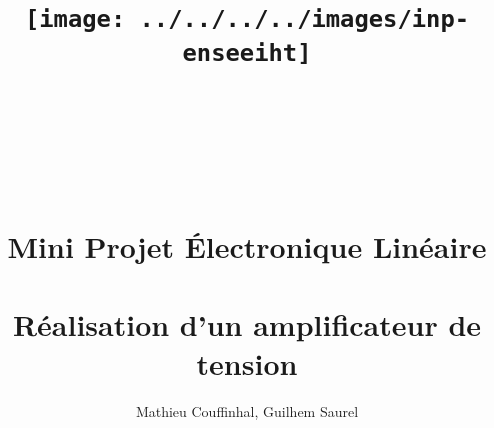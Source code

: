 \documentclass[11pt;a4paper]{report}
\title{\texttt{[image: ../../../../images/inp-enseeiht]} \\ ~ \\ ~ \\ ~ \\ ~ \\ Mini Projet Électronique Linéaire \\ ~ \\ \large{Réalisation d'un amplificateur de tension}}
\author{Mathieu Couffinhal, Guilhem Saurel}
\date{\oldstylenums{\today}}
\begin{document}
 \begin{titlepage}
  \maketitle
 \end{titlepage}

 \tableofcontents
 
 
 
 
 
 
 
 
 
 
\end{document}
